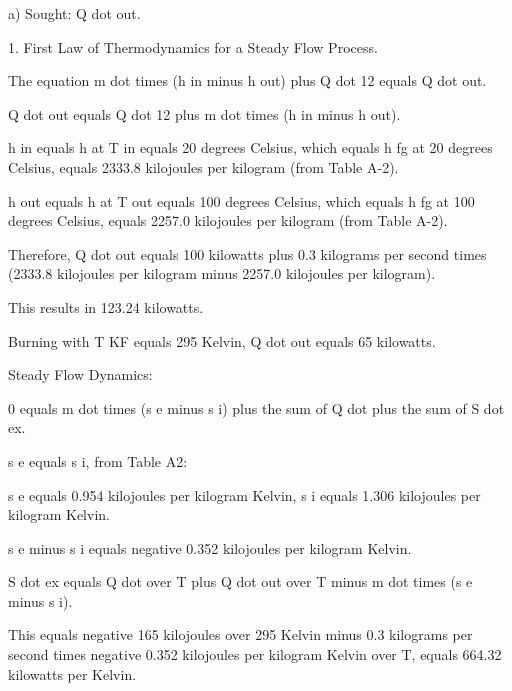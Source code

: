 a) Sought: Q dot out.

1. First Law of Thermodynamics for a Steady Flow Process.

The equation m dot times (h in minus h out) plus Q dot 12 equals Q dot out.

Q dot out equals Q dot 12 plus m dot times (h in minus h out).

h in equals h at T in equals 20 degrees Celsius, which equals h fg at 20 degrees Celsius, equals 2333.8 kilojoules per kilogram (from Table A-2).

h out equals h at T out equals 100 degrees Celsius, which equals h fg at 100 degrees Celsius, equals 2257.0 kilojoules per kilogram (from Table A-2).

Therefore, Q dot out equals 100 kilowatts plus 0.3 kilograms per second times (2333.8 kilojoules per kilogram minus 2257.0 kilojoules per kilogram).

This results in 123.24 kilowatts.

Burning with T KF equals 295 Kelvin, Q dot out equals 65 kilowatts.

Steady Flow Dynamics:

0 equals m dot times (s e minus s i) plus the sum of Q dot plus the sum of S dot ex.

s e equals s i, from Table A2:

s e equals 0.954 kilojoules per kilogram Kelvin, s i equals 1.306 kilojoules per kilogram Kelvin.

s e minus s i equals negative 0.352 kilojoules per kilogram Kelvin.

S dot ex equals Q dot over T plus Q dot out over T minus m dot times (s e minus s i).

This equals negative 165 kilojoules over 295 Kelvin minus 0.3 kilograms per second times negative 0.352 kilojoules per kilogram Kelvin over T, equals 664.32 kilowatts per Kelvin.